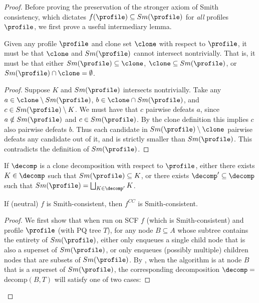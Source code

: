 \begin{proof}
Before proving the preservation of the stronger axiom of Smith consistency, which dictates $f(\profile) \subseteq Sm(\profile)$ for \emph{all} profiles $\profile$, we first prove a useful intermediary lemma.

\begin{lemma} \label{lemma:smith_intersect}
    Given any profile $\profile$ and clone set $\clone$ with respect to $\profile$, it must be that $\clone$ and $Sm(\profile)$ cannot intersect nontrivially. That is, it must be that either $Sm(\profile) \subseteq \clone$, $\clone \subseteq Sm(\profile)$, or $Sm(\profile) \cap \clone = \emptyset$. 
    
    \begin{proof}
Suppose $K$ and $Sm(\profile)$ intersects nontrivially. Take any $a \in \clone \setminus Sm(\profile)$,  $b \in \clone \cap Sm(\profile)$, and $c \in Sm(\profile) \setminus K$. We must have that $c$ pairwise defeats $a$, since $a \notin  Sm(\profile) $ and $c \in  Sm(\profile)$. By the clone definition this implies $c$ also pairwise defeats $b$. Thus each candidate in $Sm(\profile) \setminus \clone$ pairwise defeats any candidate out of it, and is strictly smaller than $Sm(\profile)$. This contradicts the definition of $Sm(\profile)$. 
    \end{proof}
    
\end{lemma}
\begin{corollary}\label{cor:smith_clone}
If $\decomp$ is a clone decomposition with respect to $\profile$, either there exists $K \in \decomp$ such that $Sm(\profile) \subseteq K$, or there exists $\decomp' \subseteq \decomp$ such that $Sm(\profile) = \bigsqcup_{K \in \decomp'}K$.
\end{corollary}

\begin{lemma}\label{lemma:cc_smith}
    If (neutral) $f$ is Smith-consistent, then $f^{CC}$ is Smith-consistent. 
\end{lemma}
\begin{proof}
    We first show that when run on SCF $f$ (which is Smith-consistent) and profile $\profile$ (with PQ tree $T$), for any node $B \subseteq A$ whose subtree contains the entirety of $Sm(\profile)$,  either only enqueues a single child node that is also a superset of $Sm(\profile)$, or only enqueues (possibly multiple) children nodes that are subsets of $Sm(\profile)$. By , when the algorithm is at node $B$ that is a superset of $Sm(\profile)$, the corresponding decomposition $\decomp=$decomp$(B,T)$ will satisfy one of two cases:


\end{proof}
\end{proof}
